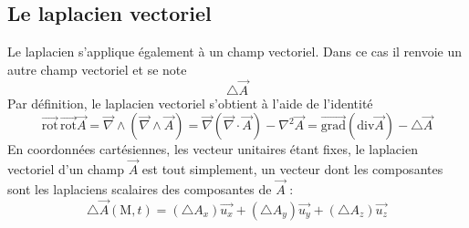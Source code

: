 \subsection{Le laplacien vectoriel}
Le laplacien s'applique également à un champ vectoriel. Dans ce cas il renvoie un autre champ vectoriel et se note 
\[
	\triangle \overrightarrow{A}	
\]
Par définition, le laplacien vectoriel s'obtient à l'aide de l'identité 
\[
\overrightarrow{\text{rot}}\,\overrightarrow{\text{rot}}\overrightarrow{A} = 
\overrightarrow{\nabla}\wedge\left(\overrightarrow{\nabla}\wedge\overrightarrow{A}\right) = 
\overrightarrow{\nabla}\left(\overrightarrow{\nabla}\cdot\overrightarrow{A}\right) - 
\nabla^{2}\overrightarrow{A} = \overrightarrow{\text{grad}}(\text{div}\overrightarrow{A})-\triangle\overrightarrow{A}	
\]
En coordonnées cartésiennes, les vecteur unitaires étant fixes, le laplacien vectoriel d'un champ  $\overrightarrow{A}$ est tout simplement, un vecteur dont les composantes sont les laplaciens scalaires des composantes de $\overrightarrow{A}$ :
	\[
	\triangle\overrightarrow{A}(\text{M},t) = \left(\triangle A_{x}\right)\overrightarrow{u_{x}} + 	
	\left(\triangle A_{y}\right)\overrightarrow{u_{y}} + \left(\triangle A_{z}\right)\overrightarrow{u_{z}}
	\]

